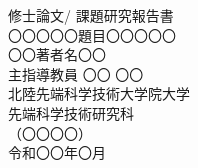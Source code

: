 \thispagestyle{empty}
\begin{center}
修士論文/ 課題研究報告書\\%
\vfill
〇〇〇〇〇題目〇〇〇〇〇\\
\vfill
〇〇著者名〇〇\\
\vfill
主指導教員  〇〇 〇〇\\
\vfill
北陸先端科学技術大学院大学\\
先端科学技術研究科\\
（〇〇〇〇）\\ %
\vfill
令和〇〇年〇月\\ %
\vfill
\end{center}

\clearpage